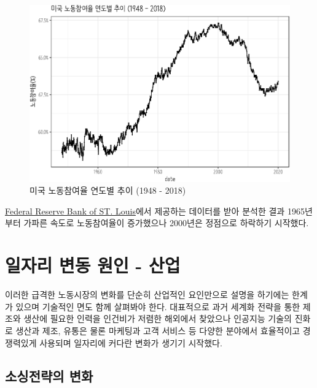 \documentclass[smallextended]{svjour3}       %
\begin{document}
\begin{figure}

{\centering \includegraphics[width=1\linewidth]{paper_files/figure-latex/fred-data-labor-participation-1} 

}

\caption{미국 노동참여율 연도별 추이 (1948 - 2018)}\label{fig:fred-data-labor-participation}
\end{figure}

\href{https://research.stlouisfed.org/docs/api/api_key.html}{Federal
Reserve Bank of ST. Louis}에서 제공하는 데이터를 받아 분석한 결과
1965년부터 가파른 속도로 노동참여율이 증가했으나 2000년은 정점으로
하락하기 시작했다.

\hypertarget{automation-job-statistics}{%
\section{일자리 변동 원인 - 산업}\label{automation-job-statistics}}

이러한 급격한 노동시장의 변화를 단순히 산업적인 요인만으로 설명을
하기에는 한계가 있으며 기술적인 면도 함께 살펴봐야 한다. 대표적으로 과거
세계화 전략을 통한 제조와 생산에 필요한 인력을 인건비가 저렴한 해외에서
찾았으나 인공지능 기술의 진화로 생산과 제조, 유통은 물론 마케팅과 고객
서비스 등 다양한 분야에서 효율적이고 경쟁력있게 사용되며 일자리에 커다란
변화가 생기기 시작했다.

\hypertarget{strategy-change}{%
\subsection{소싱전략의 변화}\label{strategy-change}}
\end{document}
